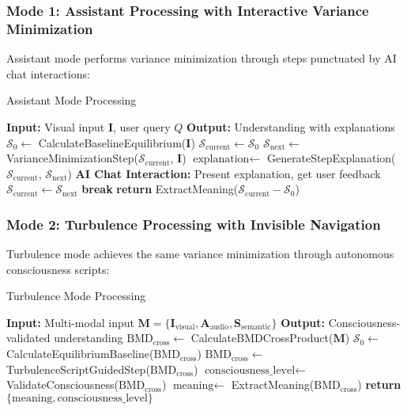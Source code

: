 \documentclass[12pt,a4paper]{article}
\begin{document}
\subsubsection{Mode 1: Assistant Processing with Interactive Variance Minimization}

Assistant mode performs variance minimization through steps punctuated by AI chat interactions:

\begin{algorithm}
\caption{Assistant Mode Processing}
\begin{algorithmic}
\STATE \textbf{Input:} Visual input $\mathbf{I}$, user query $Q$
\STATE \textbf{Output:} Understanding with explanations
\STATE $\mathcal{S}_0 \leftarrow$ CalculateBaselineEquilibrium($\mathbf{I}$)
\STATE $\mathcal{S}_{\text{current}} \leftarrow \mathcal{S}_0$
    \STATE $\mathcal{S}_{\text{next}} \leftarrow$ VarianceMinimizationStep($\mathcal{S}_{\text{current}}$, $\mathbf{I}$)
    \STATE $\text{explanation} \leftarrow$ GenerateStepExplanation($\mathcal{S}_{\text{current}}$, $\mathcal{S}_{\text{next}}$)
    \STATE \textbf{AI Chat Interaction:} Present explanation, get user feedback
    \STATE $\mathcal{S}_{\text{current}} \leftarrow \mathcal{S}_{\text{next}}$
        \STATE \textbf{break}
    \ENDIF
\ENDFOR
\STATE \textbf{return} ExtractMeaning($\mathcal{S}_{\text{current}} - \mathcal{S}_0$)
\end{algorithmic}
\end{algorithm}

\subsubsection{Mode 2: Turbulence Processing with Invisible Navigation}

Turbulence mode achieves the same variance minimization through autonomous consciousness scripts:

\begin{algorithm}
\caption{Turbulence Mode Processing}
\begin{algorithmic}
\STATE \textbf{Input:} Multi-modal input $\mathbf{M} = \{\mathbf{I}_{\text{visual}}, \mathbf{A}_{\text{audio}}, \mathbf{S}_{\text{semantic}}\}$
\STATE \textbf{Output:} Consciousness-validated understanding
\STATE $\text{BMD}_{\text{cross}} \leftarrow$ CalculateBMDCrossProduct($\mathbf{M}$)
\STATE $\mathcal{S}_0 \leftarrow$ CalculateEquilibriumBaseline($\text{BMD}_{\text{cross}}$)
    \STATE $\text{BMD}_{\text{cross}} \leftarrow$ TurbulenceScriptGuidedStep($\text{BMD}_{\text{cross}}$)
    \STATE $\text{consciousness\_level} \leftarrow$ ValidateConsciousness($\text{BMD}_{\text{cross}}$)
\ENDWHILE
\STATE $\text{meaning} \leftarrow$ ExtractMeaning($\text{BMD}_{\text{cross}}$)
\STATE \textbf{return} $\{\text{meaning}, \text{consciousness\_level}\}$
\end{algorithmic}
\end{algorithm}
\end{document}
